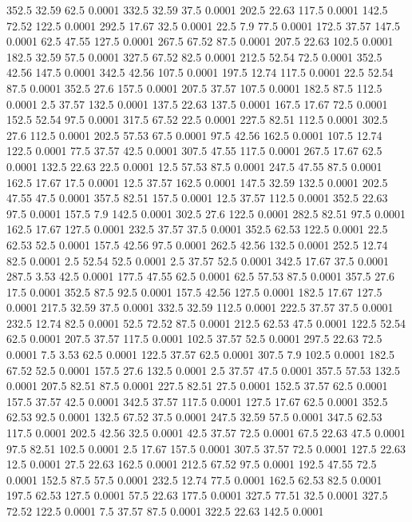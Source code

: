 352.5	32.59	62.5	0.0001
332.5	32.59	37.5	0.0001
202.5	22.63	117.5	0.0001
142.5	72.52	122.5	0.0001
292.5	17.67	32.5	0.0001
22.5	7.9	77.5	0.0001
172.5	37.57	147.5	0.0001
62.5	47.55	127.5	0.0001
267.5	67.52	87.5	0.0001
207.5	22.63	102.5	0.0001
182.5	32.59	57.5	0.0001
327.5	67.52	82.5	0.0001
212.5	52.54	72.5	0.0001
352.5	42.56	147.5	0.0001
342.5	42.56	107.5	0.0001
197.5	12.74	117.5	0.0001
22.5	52.54	87.5	0.0001
352.5	27.6	157.5	0.0001
207.5	37.57	107.5	0.0001
182.5	87.5	112.5	0.0001
2.5	37.57	132.5	0.0001
137.5	22.63	137.5	0.0001
167.5	17.67	72.5	0.0001
152.5	52.54	97.5	0.0001
317.5	67.52	22.5	0.0001
227.5	82.51	112.5	0.0001
302.5	27.6	112.5	0.0001
202.5	57.53	67.5	0.0001
97.5	42.56	162.5	0.0001
107.5	12.74	122.5	0.0001
77.5	37.57	42.5	0.0001
307.5	47.55	117.5	0.0001
267.5	17.67	62.5	0.0001
132.5	22.63	22.5	0.0001
12.5	57.53	87.5	0.0001
247.5	47.55	87.5	0.0001
162.5	17.67	17.5	0.0001
12.5	37.57	162.5	0.0001
147.5	32.59	132.5	0.0001
202.5	47.55	47.5	0.0001
357.5	82.51	157.5	0.0001
12.5	37.57	112.5	0.0001
352.5	22.63	97.5	0.0001
157.5	7.9	142.5	0.0001
302.5	27.6	122.5	0.0001
282.5	82.51	97.5	0.0001
162.5	17.67	127.5	0.0001
232.5	37.57	37.5	0.0001
352.5	62.53	122.5	0.0001
22.5	62.53	52.5	0.0001
157.5	42.56	97.5	0.0001
262.5	42.56	132.5	0.0001
252.5	12.74	82.5	0.0001
2.5	52.54	52.5	0.0001
2.5	37.57	52.5	0.0001
342.5	17.67	37.5	0.0001
287.5	3.53	42.5	0.0001
177.5	47.55	62.5	0.0001
62.5	57.53	87.5	0.0001
357.5	27.6	17.5	0.0001
352.5	87.5	92.5	0.0001
157.5	42.56	127.5	0.0001
182.5	17.67	127.5	0.0001
217.5	32.59	37.5	0.0001
332.5	32.59	112.5	0.0001
222.5	37.57	37.5	0.0001
232.5	12.74	82.5	0.0001
52.5	72.52	87.5	0.0001
212.5	62.53	47.5	0.0001
122.5	52.54	62.5	0.0001
207.5	37.57	117.5	0.0001
102.5	37.57	52.5	0.0001
297.5	22.63	72.5	0.0001
7.5	3.53	62.5	0.0001
122.5	37.57	62.5	0.0001
307.5	7.9	102.5	0.0001
182.5	67.52	52.5	0.0001
157.5	27.6	132.5	0.0001
2.5	37.57	47.5	0.0001
357.5	57.53	132.5	0.0001
207.5	82.51	87.5	0.0001
227.5	82.51	27.5	0.0001
152.5	37.57	62.5	0.0001
157.5	37.57	42.5	0.0001
342.5	37.57	117.5	0.0001
127.5	17.67	62.5	0.0001
352.5	62.53	92.5	0.0001
132.5	67.52	37.5	0.0001
247.5	32.59	57.5	0.0001
347.5	62.53	117.5	0.0001
202.5	42.56	32.5	0.0001
42.5	37.57	72.5	0.0001
67.5	22.63	47.5	0.0001
97.5	82.51	102.5	0.0001
2.5	17.67	157.5	0.0001
307.5	37.57	72.5	0.0001
127.5	22.63	12.5	0.0001
27.5	22.63	162.5	0.0001
212.5	67.52	97.5	0.0001
192.5	47.55	72.5	0.0001
152.5	87.5	57.5	0.0001
232.5	12.74	77.5	0.0001
162.5	62.53	82.5	0.0001
197.5	62.53	127.5	0.0001
57.5	22.63	177.5	0.0001
327.5	77.51	32.5	0.0001
327.5	72.52	122.5	0.0001
7.5	37.57	87.5	0.0001
322.5	22.63	142.5	0.0001
